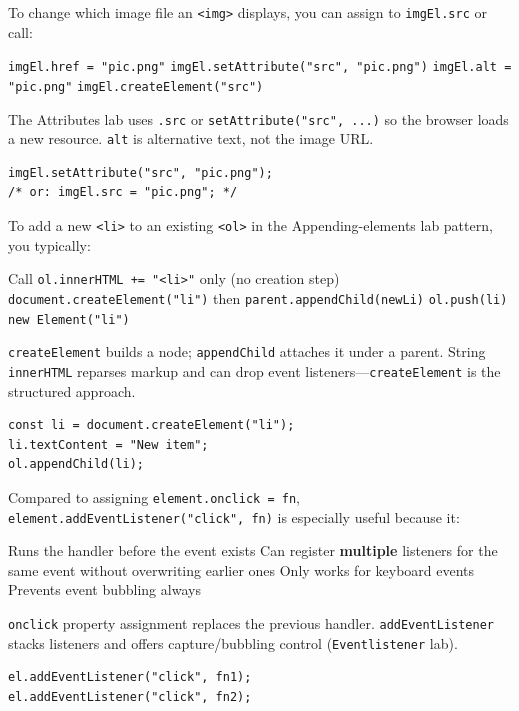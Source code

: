\newpage
{}

\question[4]
To change which image file an \texttt{<img>} displays, you can assign to \texttt{imgEl.src} or call:
\begin{choices}
  \choice \texttt{imgEl.href = "pic.png"}
  \CorrectChoice \texttt{imgEl.setAttribute("src", "pic.png")}
  \choice \texttt{imgEl.alt = "pic.png"}
  \choice \texttt{imgEl.createElement("src")}
\end{choices}
\begin{solution}
  The Attributes lab uses \texttt{.src} or \texttt{setAttribute("src", ...)} so the browser loads a new resource. \texttt{alt} is alternative text, not the image URL.
\begin{lstlisting}[style=js]
imgEl.setAttribute("src", "pic.png");
/* or: imgEl.src = "pic.png"; */
\end{lstlisting}
\end{solution}

\question[4]
To add a new \texttt{<li>} to an existing \texttt{<ol>} in the Appending-elements lab pattern, you typically:
\begin{choices}
  \choice Call \texttt{ol.innerHTML += "<li>"} only (no creation step)
  \CorrectChoice \texttt{document.createElement("li")} then \texttt{parent.appendChild(newLi)}
  \choice \texttt{ol.push(li)}
  \choice \texttt{new Element("li")}
\end{choices}
\begin{solution}
  \texttt{createElement} builds a node; \texttt{appendChild} attaches it under a parent. String \texttt{innerHTML} reparses markup and can drop event listeners---\texttt{createElement} is the structured approach.
\begin{lstlisting}[style=js]
const li = document.createElement("li");
li.textContent = "New item";
ol.appendChild(li);
\end{lstlisting}
\end{solution}

\question[4]
Compared to assigning \texttt{element.onclick = fn}, \texttt{element.addEventListener("click", fn)} is especially useful because it:
\begin{choices}
  \choice Runs the handler before the event exists
  \CorrectChoice Can register \textbf{multiple} listeners for the same event without overwriting earlier ones
  \choice Only works for keyboard events
  \choice Prevents event bubbling always
\end{choices}
\begin{solution}
  \texttt{onclick} property assignment replaces the previous handler. \texttt{addEventListener} stacks listeners and offers capture/bubbling control (\texttt{Eventlistener} lab).
\begin{lstlisting}[style=js]
el.addEventListener("click", fn1);
el.addEventListener("click", fn2);
\end{lstlisting}
\end{solution}

